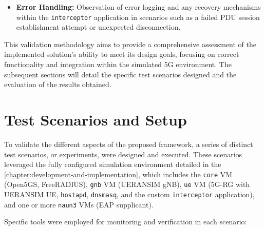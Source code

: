 \begin{enumerate}
{\begin{itemize}
            \item \textbf{Error Handling:} Observation of error logging and any recovery mechanisms within the \texttt{interceptor} application in scenarios such as a failed \ac{PDU} session establishment attempt or unexpected disconnection.
        \end{itemize}
    }
\end{enumerate}

This validation methodology aims to provide a comprehensive assessment of the implemented solution's ability to meet its design goals, focusing on correct functionality and integration within the simulated \ac{5G} environment. The subsequent sections will detail the specific test scenarios designed and the evaluation of the results obtained.

\section{Test Scenarios and Setup}

To validate the different aspects of the proposed framework, a series of distinct test scenarios, or experiments, were designed and executed. These scenarios leveraged the fully configured simulation environment detailed in the \ref{chapter:development-and-implementation}, which includes the \texttt{core} \ac{VM} (Open5GS, FreeRADIUS), \texttt{gnb} \ac{VM} (UERANSIM gNB), \texttt{ue} \ac{VM} (\ac{5G-RG} with UERANSIM UE, \texttt{hostapd}, \texttt{dnsmasq}, and the custom \texttt{interceptor} application), and one or more \texttt{naun3} \acp{VM} (\ac{EAP} supplicant).

Specific tools were employed for monitoring and verification in each scenario:

